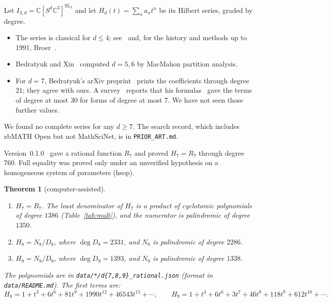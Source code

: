 \documentclass[11pt]{amsart}
\newtheorem{theorem}{Theorem}
\theoremstyle{definition}
\theoremstyle{remark}
\newcommand{\C}{\mathbb{C}}
\newcommand{\SL}{\mathrm{SL}}
\begin{document}
Let $I_{3,d}=\C[S^d\C^3]^{\SL_3}$ and let $H_d(t)=\sum_n a_nt^n$ be its Hilbert series, graded by degree.
\begin{itemize}
\item The series is classical for $d\le4$; see~\cite{BX} and, for the history and methods up to 1991, Broer~\cite{Broer}.
\item Bedratyuk and Xin~\cite{BX} computed $d=5,6$ by MacMahon partition analysis.
\item For $d=7$, Bedratyuk's arXiv preprint~\cite{Bed09} prints the coefficients through degree $21$; they agree with ours. A survey~\cite{BBDGK} reports that his formulas~\cite{Bed09,Bed10} gave the terms of degree at most $30$ for forms of degree at most $7$. We have not seen those further values.
\end{itemize}
We found no complete series for any $d\ge7$. The search record, which includes zbMATH Open but not MathSciNet, is in \texttt{PRIOR\_ART.md}.

Version~0.1.0~\cite{V01} gave a rational function $R_7$ and proved $H_7=R_7$ through degree $760$. Full equality was proved only under an unverified hypothesis on a homogeneous system of parameters (hsop).

\begin{theorem}[computer-assisted]\label{thm:main}
\begin{enumerate}
\item $H_7=R_7$. The least denominator of $H_7$ is a product of cyclotomic polynomials of degree $1386$ (Table~\ref{tab:mult}), and the numerator is palindromic of degree $1350$.
\item $H_8=N_8/D_8$, where $\deg D_8=2331$, and $N_8$ is palindromic of degree $2286$.
\item $H_9=N_9/D_9$, where $\deg D_9=1393$, and $N_9$ is palindromic of degree $1338$.
\end{enumerate}
The polynomials are in \texttt{data/*/d\{7,8,9\}\_rational.json} (format in \texttt{data/README.md}). The first terms are:
\[
H_8=1+t^3+6t^6+81t^9+1990t^{12}+46543t^{15}+\cdots,\qquad
H_9=1+t^4+6t^6+3t^7+46t^8+118t^9+612t^{10}+\cdots.
\]
\end{theorem}
\end{document}
